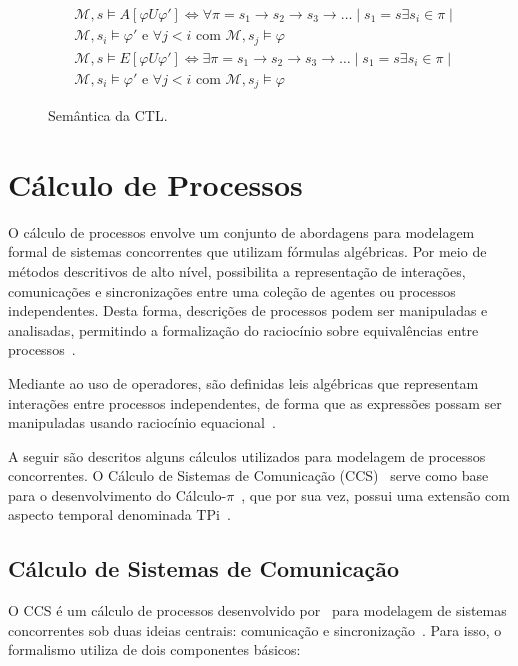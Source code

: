 \begin{figure}[ht]
\begin{align}
	&\mathcal{M},s  \models  A[\varphi U \varphi'] \iff \forall \pi = s_1\to s_2\to s_3\to \dots \mid s_1 = s \exists s_i \in \pi \mid \\
	&\mathcal{M}, s_i \models \varphi' \mbox{ e } \forall j < i \mbox{ com }  \mathcal{M}, s_j \models \varphi \\
	&\mathcal{M},s  \models  E[\varphi U \varphi'] \iff \exists \pi = s_1\to s_2\to s_3\to \dots \mid s_1 = s \exists s_i \in \pi \mid \\
	&\mathcal{M}, s_i \models \varphi' \mbox{ e } \forall j < i \mbox{ com }  \mathcal{M}, s_j \models \varphi
	\end{align}
	\caption{Semântica da CTL.
		\label{fig:ctl_sem}}
\end{figure}
\FloatBarrier

\section{Cálculo de Processos}

O cálculo de processos envolve um conjunto de abordagens para modelagem formal de sistemas concorrentes que utilizam fórmulas algébricas. Por meio de métodos descritivos de alto nível, possibilita a representação de interações, comunicações e sincronizações entre uma coleção de agentes ou processos independentes. Desta forma, descrições de processos podem ser manipuladas e analisadas, permitindo a formalização do raciocínio sobre equivalências entre processos~\cite{baeten2005brief}.

Mediante ao uso de operadores, são definidas leis algébricas que representam interações entre processos independentes, de forma que as expressões possam ser manipuladas usando raciocínio equacional~\cite{baeten2005brief}.

A seguir são descritos alguns cálculos utilizados para modelagem de processos concorrentes. O Cálculo de Sistemas de Comunicação (CCS)~\cite{milner1986ccs} serve como base para o desenvolvimento do Cálculo-$\pi$~\cite{milner1992calculus, milner1992calculus2}, que por sua vez, possui uma extensão com aspecto temporal denominada TPi~\cite{berger2003two}.

\subsection{Cálculo de Sistemas de Comunicação}

O CCS é um cálculo de processos desenvolvido por~\citeauthor{milner1986ccs} para modelagem de sistemas concorrentes sob duas ideias centrais: comunicação e sincronização~\cite{milner1986ccs}. Para isso, o formalismo utiliza de dois componentes básicos:

